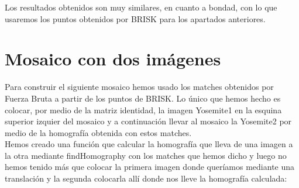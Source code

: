 \documentclass[10pt,a4paper]{article}
\begin{document}
Los resultados obtenidos son muy similares, en cuanto a bondad, con lo que usaremos los puntos obtenidos por BRISK para los apartados anteriores.\\

\newpage
\section{Mosaico con dos imágenes}

Para construir el siguiente mosaico hemos usado los matches obtenidos por Fuerza Bruta a partir de los puntos de BRISK. Lo único que hemos hecho es colocar, por medio de la matriz identidad, la imagen Yosemite1 en la esquina superior izquier del mosaico y a continuación llevar al mosaico la Yosemite2 por medio de la homografía obtenida con estos matches.\\

Hemos creado una función que calcular la homografía que lleva de una imagen a la otra mediante findHomography con los matches que hemos dicho y luego no hemos tenido más que colocar la primera imagen donde queríamos mediante una translación y la segunda colocarla allí donde nos lleve la homografía calculada:\\
\end{document}

